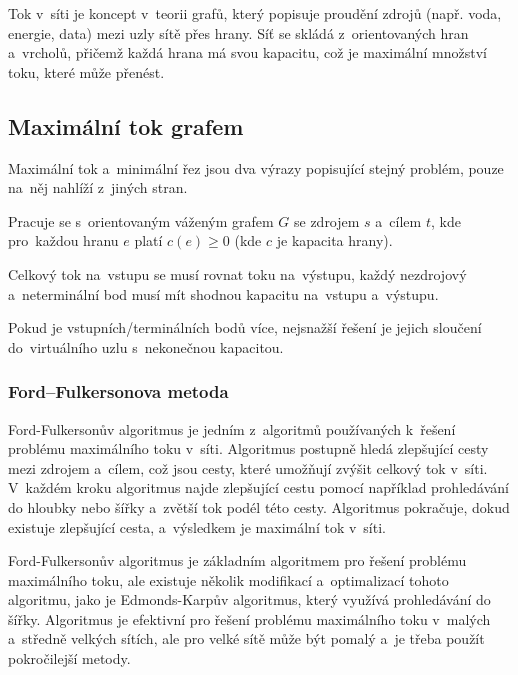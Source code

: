 Tok v~síti je koncept v~teorii grafů, který popisuje proudění zdrojů (např. voda, energie, data) mezi uzly sítě přes hrany. Síť se skládá z~orientovaných hran a~vrcholů, přičemž každá hrana má svou kapacitu, což je maximální množství toku, které může přenést.

\subsection{Maximální tok grafem}

Maximální tok a~minimální řez jsou dva výrazy popisující stejný problém, pouze na~něj nahlíží z~jiných stran.

Pracuje se s~orientovaným váženým grafem $G$ se zdrojem $s$ a~cílem $t$, kde pro~každou hranu $e$ platí $c(e) \geq 0$ (kde $c$ je kapacita hrany).

Celkový tok na~vstupu se musí rovnat toku na~výstupu, každý nezdrojový a~neterminální bod musí mít shodnou kapacitu na~vstupu a~výstupu.

Pokud je vstupních/terminálních bodů více, nejsnažší řešení je jejich sloučení do~virtuálního uzlu s~nekonečnou kapacitou.

\subsubsection{Ford--Fulkersonova metoda}

Ford-Fulkersonův algoritmus je jedním z~algoritmů používaných k~řešení problému maximálního toku v~síti. Algoritmus postupně hledá zlepšující cesty mezi zdrojem a~cílem, což jsou cesty, které umožňují zvýšit celkový tok v~síti. V~každém kroku algoritmus najde zlepšující cestu pomocí například prohledávání do hloubky nebo šířky a~zvětší tok podél této cesty. Algoritmus pokračuje, dokud existuje zlepšující cesta, a~výsledkem je maximální tok v~síti.

Ford-Fulkersonův algoritmus je základním algoritmem pro řešení problému maximálního toku, ale existuje několik modifikací a~optimalizací tohoto algoritmu, jako je Edmonds-Karpův algoritmus, který využívá prohledávání do šířky. Algoritmus je efektivní pro řešení problému maximálního toku v~malých a~středně velkých sítích, ale pro velké sítě může být pomalý a~je třeba použít pokročilejší metody.

